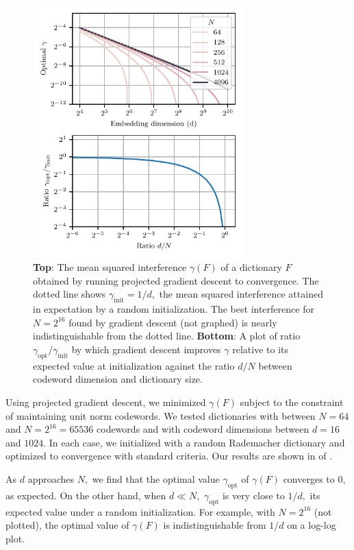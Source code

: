 \begin{figure}[h]
	\begin{center}
		\centerline{\includegraphics[width=230pt]{figures/gd_interference}}
		\caption{\textbf{Top}: The mean squared interference $\gamma(F)$ of a dictionary $F$ obtained by running projected gradient descent to convergence. The dotted line shows $\gamma_{\text{init}} = 1/d,$ the mean squared interference attained in expectation by a random initialization. The best interference for $N = 2^{16}$ found by gradient descent (not graphed) is nearly indistinguishable from the dotted line. \textbf{Bottom}: A plot of ratio $\gamma_{\text{opt}}/ \gamma_{\text{init}}$ by which gradient descent improves $\gamma$ relative to its expected value at initialization against the ratio $d/N$ between codeword dimension and dictionary size.}
		\label{fig:gd-interference}
	\end{center}
\end{figure}

Using projected gradient descent, we minimized $\gamma(F)$ subject to the constraint of maintaining unit norm codewords. We tested dictionaries with between $N = 64$ and $N = 2^{16} = 65536$ codewords and with codeword dimensions between $d = 16$ and $1024$. In each case, we initialized with a random Rademacher dictionary and optimized to convergence with standard criteria. Our results are shown in  of .

As $d$ approaches $N,$ we find that the optimal value $\gamma_\text{opt}$ of $\gamma(F)$ converges to $0,$ as expected. On the other hand, when $d \ll N,$ $\gamma_\text{opt}$ is very close to $1/d,$ its expected value under a random initialization. For example, with $N = 2^{16}$ (not plotted), the optimal value of $\gamma(F)$ is indistinguishable from $1/d$ on a log-log plot.

